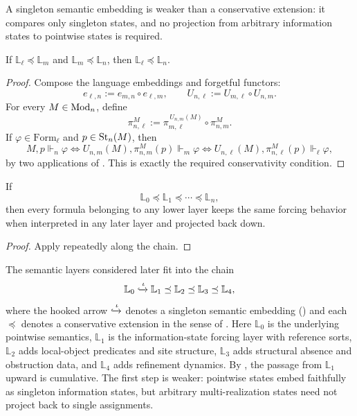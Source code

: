 A singleton semantic embedding is weaker than a conservative extension: it compares only singleton states, and no projection from arbitrary information states to pointwise states is required.

\begin{proposition}\label{prop:conservative-composition}
If $\mathbb{L}_\ell\preceq\mathbb{L}_m$ and $\mathbb{L}_m\preceq\mathbb{L}_n$, then $\mathbb{L}_\ell\preceq\mathbb{L}_n$.
\end{proposition}

\begin{proof}
Compose the language embeddings and forgetful functors:
\[
e_{\ell,n}:=e_{m,n}\circ e_{\ell,m},
\qquad
U_{n,\ell}:=U_{m,\ell}\circ U_{n,m}.
\]
For every $M\in\mathrm{Mod}_n$, define
\[
\pi^M_{n,\ell}:=
\pi^{\,U_{n,m}(M)}_{m,\ell}\circ \pi^M_{n,m}.
\]
If $\varphi\in\mathrm{Form}_\ell$ and $p\in\mathrm{St}_n(M)$, then
\[
M,p\Vdash_n\varphi
\Longleftrightarrow
U_{n,m}(M),\pi^M_{n,m}(p)\Vdash_m\varphi
\Longleftrightarrow
U_{n,\ell}(M),\pi^M_{n,\ell}(p)\Vdash_\ell\varphi,
\]
by two applications of . This is exactly the required conservativity condition.
\end{proof}

\begin{corollary}\label{cor:whole-chain-invariance}
If
\[
\mathbb{L}_0\preceq\mathbb{L}_1\preceq\cdots\preceq\mathbb{L}_n,
\]
then every formula belonging to any lower layer keeps the same forcing behavior when interpreted in any later layer and projected back down.
\end{corollary}

\begin{proof}
Apply  repeatedly along the chain.
\end{proof}

The semantic layers considered later fit into the chain
\[
\mathbb{L}_0
\xhookrightarrow{\iota}
\mathbb{L}_1
\preceq
\mathbb{L}_2
\preceq
\mathbb{L}_3
\preceq
\mathbb{L}_4,
\]
where the hooked arrow $\xhookrightarrow{\iota}$ denotes a singleton semantic embedding () and each $\preceq$ denotes a conservative extension in the sense of . Here $\mathbb{L}_0$ is the underlying pointwise semantics, $\mathbb{L}_1$ is the information-state forcing layer with reference sorts, $\mathbb{L}_2$ adds local-object predicates and site structure, $\mathbb{L}_3$ adds structural absence and obstruction data, and $\mathbb{L}_4$ adds refinement dynamics. By , the passage from $\mathbb{L}_1$ upward is cumulative. The first step is weaker: pointwise states embed faithfully as singleton information states, but arbitrary multi-realization states need not project back to single assignments.

